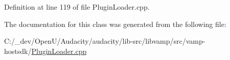 Definition at line 119 of file Plugin\+Loader.\+cpp.



The documentation for this class was generated from the following file\+:\begin{DoxyCompactItemize}
\item 
C\+:/\+\_\+dev/\+Open\+U/\+Audacity/audacity/lib-\/src/libvamp/src/vamp-\/hostsdk/\hyperlink{_plugin_loader_8cpp}{Plugin\+Loader.\+cpp}\end{DoxyCompactItemize}
